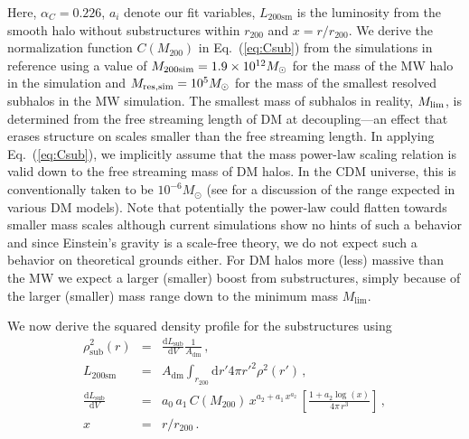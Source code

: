 \documentclass[10pt,aps,pra,reprint,amsmath,amsfonts,amssymb,showpacs,nofootinbib,floatfix]{revtex4-1}
\newcommand{\rmn}{\mathrm}
\newcommand{\msun}{M_\odot}
\newcommand{\sm}{\rmn{sm}}
\newcommand{\dd}{\rmn{d}}
\newcommand{\rvir}{r_{200}}
\newcommand{\mvir}{M_{200}}
\begin{document}
Here, $\alpha_C=0.226$, $a_i$ denote our fit variables, $L_{200\sm}$
is the luminosity from the smooth halo without substructures within
$\rvir$ and $x= r/\rvir$.  We derive the normalization function
$C(\mvir)$ in Eq.~(\ref{eq:Csub}) from the simulations in reference
\cite{2008Natur.456...73S} using a value of $M_{\rm
  200sim}=1.9\times10^{12}\msun$ for the mass of the MW halo in the
simulation and $M_{\rm res,sim}=10^5\msun$ for the mass of the
smallest resolved subhalos in the MW simulation.  The smallest mass of
subhalos in reality, $M_{\rm lim}$, is determined from the free
streaming length of DM at decoupling---an effect that erases structure
on scales smaller than the free streaming length. In applying
Eq.~(\ref{eq:Csub}), we implicitly assume that the mass power-law
scaling relation is valid down to the free streaming mass of DM
halos. In the CDM universe, this is conventionally taken to be
$10^{-6}\msun$ \cite{2001PhRvD..64h3507H, 2005JCAP...08..003G} (see
\cite{2009NJPh...11j5027B} for a discussion of the range expected in
various DM models). Note that potentially the power-law could flatten
towards smaller mass scales although current simulations show no hints
of such a behavior and since Einstein's gravity is a scale-free
theory, we do not expect such a behavior on theoretical grounds
either.  For DM halos more (less) massive than the MW we expect a
larger (smaller) boost from substructures, simply because of the
larger (smaller) mass range down to the minimum mass $M_\rmn{lim}$.

We now derive the squared density profile for the substructures
using
\begin{eqnarray}
\rho_\rmn{sub}^2(r) &=& \frac{\dd L_\rmn{sub}}{\dd V} \frac{1}{A_{\rmn{dm}}}\,,\label{eq:rho_sub}\\
L_{200\sm} &=&  A_{\rmn{dm}} \int_{\rvir} \dd r' 4\pi r'^2 \rho^2(r')\,,\label{eq:Lsm}\\
 \frac{\dd L_\rmn{sub}}{\dd V} &=& a_0\,a_1\,C(\mvir)\,x^{a_2+a_1\,x^{a_2}}\,
\left[\frac{1+a_2\log(x)}{4\pi\,r^3}\right]\,,\\
x &=& r/\rvir\,.\label{eq:xvir}
\end{eqnarray} 
\end{document}

